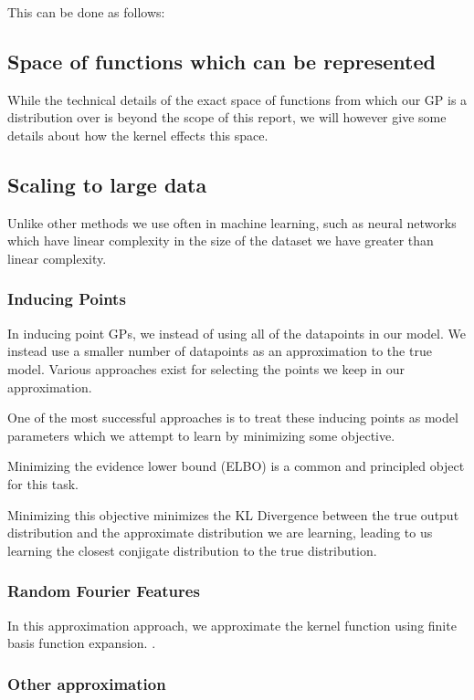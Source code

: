 \documentclass[12pt, a4paper]{report}
\theoremstyle{definition}
\theoremstyle{definition}
\theoremstyle{definition}
\begin{document}
This can be done as follows: 

\subsection{Space of functions which can be represented}

While the technical details of the exact space of functions from which our GP is a distribution over is beyond the scope of this report, we will however give some details about how the kernel effects this space.




\subsection{Scaling to large data}

Unlike other methods we use often in machine learning, such as neural networks which have linear complexity in the size of the dataset we have greater than linear complexity.

\subsubsection{Inducing Points}

In inducing point GPs, we instead of using all of the datapoints in our model. We instead use a smaller number of datapoints as an approximation to the true model. Various approaches exist for selecting the points we keep in our approximation.

One of the most successful approaches is to treat these inducing points as model parameters which we attempt to learn by minimizing some objective.

Minimizing the evidence lower bound (ELBO) is a common and principled object for this task.

Minimizing this objective minimizes the KL Divergence between the true output distribution and the approximate distribution we are learning, leading to us learning the closest conjigate distribution to the true distribution.

\subsubsection{Random Fourier Features}

In this approximation approach, we approximate the kernel function using finite basis function expansion. \cite{RFF}. 


\subsubsection{Other approximation}
\end{document}
